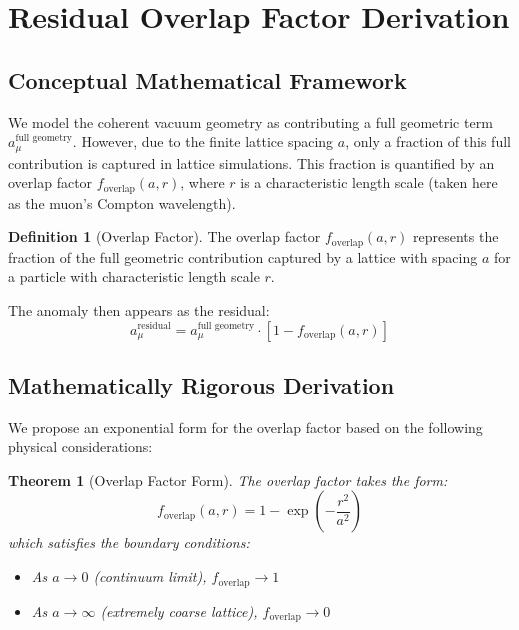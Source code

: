 ﻿\documentclass[12pt]{article}
\theoremstyle{definition}
\newtheorem{definition}{Definition}
\theoremstyle{plain}
\newtheorem{theorem}{Theorem}
\begin{document}
\section{Residual Overlap Factor Derivation}


\subsection{Conceptual Mathematical Framework}


We model the coherent vacuum geometry as contributing a full geometric term $a_\mu^{\text{full geometry}}$. However, due to the finite lattice spacing $a$, only a fraction of this full contribution is captured in lattice simulations. This fraction is quantified by an overlap factor $f_{\mathrm{overlap}}(a, r)$, where $r$ is a characteristic length scale (taken here as the muon's Compton wavelength).


\begin{definition}[Overlap Factor]
The overlap factor $f_{\mathrm{overlap}}(a, r)$ represents the fraction of the full geometric contribution captured by a lattice with spacing $a$ for a particle with characteristic length scale $r$.
\end{definition}


The anomaly then appears as the residual:
\begin{equation}
a_\mu^{\text{residual}} = a_\mu^{\text{full geometry}} \cdot \left[1 - f_{\mathrm{overlap}}(a, r)\right]
\label{eq:residual}
\end{equation}


\subsection{Mathematically Rigorous Derivation}


We propose an exponential form for the overlap factor based on the following physical considerations:


\begin{theorem}[Overlap Factor Form]
The overlap factor takes the form:
\begin{equation}
f_{\mathrm{overlap}}(a, r) = 1 - \exp\left(-\frac{r^2}{a^2}\right)
\label{eq:overlap}
\end{equation}
which satisfies the boundary conditions:
\begin{itemize}
    \item As $a \to 0$ (continuum limit), $f_{\mathrm{overlap}} \to 1$
    \item As $a \to \infty$ (extremely coarse lattice), $f_{\mathrm{overlap}} \to 0$
\end{itemize}
\end{theorem}
\end{document}
